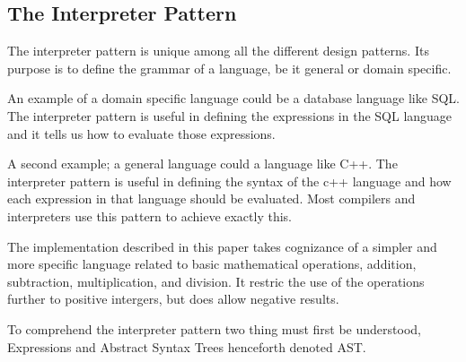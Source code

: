 \subsection{The Interpreter Pattern}
The interpreter pattern is unique among all the different design patterns.
Its purpose is to define the grammar of a language, be it general or domain
specific. 

An example of a domain specific language could be a database language like
SQL. The interpreter pattern is useful in defining the expressions in the 
SQL language and it tells us how to evaluate those expressions.

A second example; a general language could a language like C++. The interpreter
pattern is useful in defining the syntax of the c++ language and how each expression
in that language should be evaluated. Most compilers and interpreters use this 
pattern to achieve exactly this.

The implementation described in this paper takes cognizance of a simpler and 
more specific language related to basic mathematical operations, addition,
subtraction, multiplication, and division. It restric the use of the operations
further to positive intergers, but does allow negative results.

To comprehend the interpreter pattern two thing must first be understood, Expressions
and Abstract Syntax Trees henceforth denoted AST.


